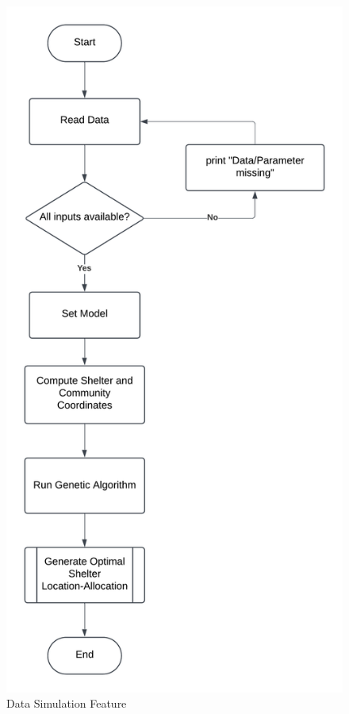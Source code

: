 \begin{appendices}
\begin{centerappendixtitle}
		\begin{figure}[h]
			\centering
			\caption{Data Simulation Feature}
			\label{simFlow}
			\includegraphics[width=\linewidth]{appendix/datasim f}
		\end{figure}
		

\end{centerappendixtitle}
\end{appendices}
